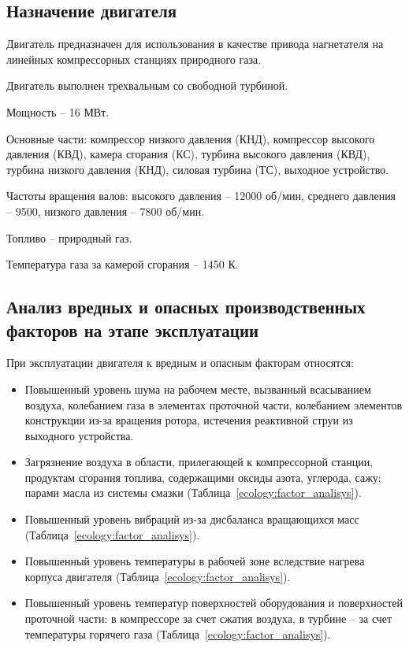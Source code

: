 \label{sec:ecology}

\subsection{Назначение двигателя}
\label{sub:ecology_engine_purpose}

Двигатель предназначен для использования в качестве привода нагнетателя на линейных компрессорных станциях природного газа.

Двигатель выполнен трехвальным со свободной турбиной.

Мощность – 16 МВт.

Основные части: компрессор низкого давления (КНД), компрессор высокого давления (КВД), камера сгорания (КС), турбина высокого давления (КВД), турбина низкого давления (КНД), силовая турбина (ТС), выходное устройство.

Частоты вращения валов: высокого давления – 12000 об/мин, среднего давления – 9500, низкого давления – 7800 об/мин.

Топливо – природный газ.

Температура газа за камерой сгорания – 1450 К.

\subsection{Анализ вредных и опасных производственных факторов на этапе эксплуатации} %
\label{sub:ecology_factor_analisys}

При эксплуатации двигателя к вредным и опасным факторам относятся:
\begin{itemize}
	\item Повышенный уровень шума на рабочем месте, вызванный всасыванием воздуха, колебанием газа в элементах проточной части, колебанием элементов конструкции из-за вращения ротора, истечения реактивной струи из выходного устройства.
	\item Загрязнение воздуха в области, прилегающей к компрессорной станции, продуктам сгорания топлива, содержащими оксиды азота, углерода, сажу; парами масла из системы смазки (Таблица~\ref{ecology:factor_analisys}).
	\item Повышенный уровень вибраций из-за дисбаланса вращающихся масс (Таблица~\ref{ecology:factor_analisys}).
	\item Повышенный уровень температуры в рабочей зоне вследствие нагрева корпуса двигателя (Таблица~\ref{ecology:factor_analisys}).
	\item Повышенный уровень температур поверхностей оборудования и поверхностей проточной части: в компрессоре за счет сжатия воздуха, в турбине – за счет температуры горячего газа (Таблица~\ref{ecology:factor_analisys}).
\end{itemize}

